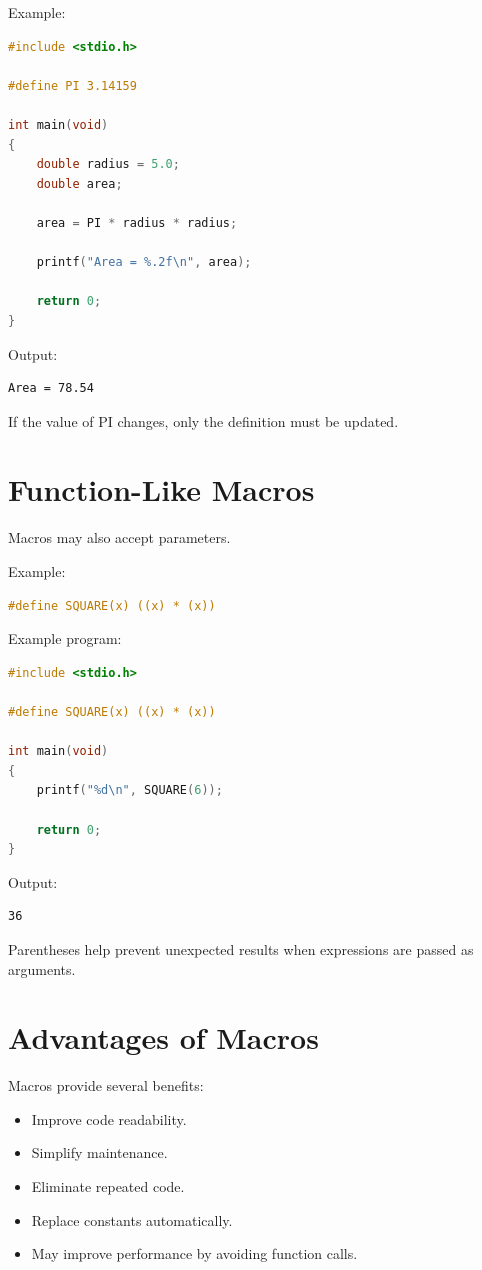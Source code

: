 \documentclass[12pt,openany]{book}
\begin{document}
Example:

\begin{lstlisting}[language=C]
#include <stdio.h>

#define PI 3.14159

int main(void)
{
    double radius = 5.0;
    double area;

    area = PI * radius * radius;

    printf("Area = %.2f\n", area);

    return 0;
}
\end{lstlisting}

Output:

\begin{lstlisting}
Area = 78.54
\end{lstlisting}

If the value of PI changes, only the definition must be updated.

\section{Function-Like Macros}

Macros may also accept parameters.

Example:

\begin{lstlisting}[language=C]
#define SQUARE(x) ((x) * (x))
\end{lstlisting}

Example program:

\begin{lstlisting}[language=C]
#include <stdio.h>

#define SQUARE(x) ((x) * (x))

int main(void)
{
    printf("%d\n", SQUARE(6));

    return 0;
}
\end{lstlisting}

Output:

\begin{lstlisting}
36
\end{lstlisting}

Parentheses help prevent unexpected results when expressions are passed as arguments.

\section{Advantages of Macros}

Macros provide several benefits:

\begin{itemize}
    \item Improve code readability.
    \item Simplify maintenance.
    \item Eliminate repeated code.
    \item Replace constants automatically.
    \item May improve performance by avoiding function calls.
\end{itemize}
\end{document}

